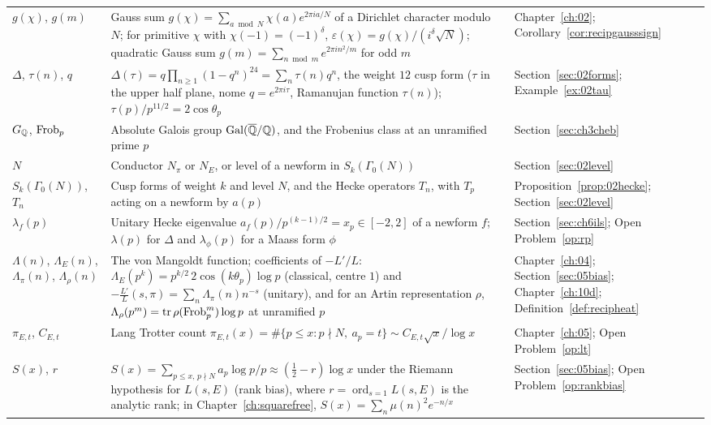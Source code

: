 {\begin{longtable}{p{0.8in}p{2.65in}p{0.95in}}
\raggedright $g(\chi)$, $g(m)$ & \raggedright Gauss sum $g(\chi)=\sum_{a\bmod N}\chi(a)e^{2\pi ia/N}$ of a Dirichlet character modulo $N$; for primitive $\chi$ with $\chi(-1)=(-1)^\delta$, $\varepsilon(\chi)=g(\chi)/(i^\delta\sqrt N)$; quadratic Gauss sum $g(m)=\sum_{n\bmod m}e^{2\pi in^2/m}$ for odd $m$ & \raggedright Chapter~\ref{ch:02}; Corollary~\ref{cor:recipgausssign}\tabularnewline[1pt]
\raggedright $\Delta$, $\tau(n)$, $q$ & \raggedright $\Delta(\tau)=q\prod_{n\ge1}(1-q^n)^{24}=\sum_n\tau(n)q^n$, the weight $12$ cusp form ($\tau$ in the upper half plane, nome $q=e^{2\pi i\tau}$, Ramanujan function $\tau(n)$); $\tau(p)/p^{11/2}=2\cos\theta_p$ & \raggedright Section~\ref{sec:02forms}; Example~\ref{ex:02tau}\tabularnewline[1pt]
\raggedright $G_{\mathbb{Q}}$, $\operatorname{Frob}_p$ & \raggedright Absolute Galois group $\operatorname{Gal}(\overline{\mathbb{Q}}/\mathbb{Q})$, and the Frobenius class at an unramified prime $p$ & \raggedright Section~\ref{sec:ch3cheb}\tabularnewline[1pt]
\raggedright $N$ & \raggedright Conductor $N_\pi$ or $N_E$, or level of a newform in $S_k(\Gamma_0(N))$ & \raggedright Section~\ref{sec:02level}\tabularnewline[1pt]
\raggedright $S_k(\Gamma_0(N))$, $T_n$ & \raggedright Cusp forms of weight $k$ and level $N$, and the Hecke operators $T_n$, with $T_p$ acting on a newform by $a(p)$ & \raggedright Proposition~\ref{prop:02hecke}; Section~\ref{sec:02level}\tabularnewline[1pt]
\raggedright $\lambda_f(p)$ & \raggedright Unitary Hecke eigenvalue $a_f(p)/p^{(k-1)/2}=x_p\in[-2,2]$ of a newform $f$; $\lambda(p)$ for $\Delta$ and $\lambda_\phi(p)$ for a Maass form $\phi$ & \raggedright Section~\ref{sec:ch6ils}; Open Problem~\ref{op:rp}\tabularnewline[1pt]
\raggedright $\Lambda(n)$, $\Lambda_E(n)$, $\Lambda_\pi(n)$, $\Lambda_\rho(n)$ & \raggedright The von Mangoldt function; coefficients of $-L'/L$: $\Lambda_E(p^k)=p^{k/2}\,2\cos(k\theta_p)\log p$ (classical, centre $1$) and $-\frac{L'}L(s,\pi)=\sum_n\Lambda_\pi(n)n^{-s}$ (unitary), and for an Artin representation $\rho$, $\Lambda_\rho(p^m)=\operatorname{tr}\rho(\operatorname{Frob}_p^m)\log p$ at unramified $p$ & \raggedright Chapter~\ref{ch:04}; Section~\ref{sec:05bias}; Chapter~\ref{ch:10d}; Definition~\ref{def:recipheat}\tabularnewline[1pt]
\raggedright $\pi_{E,t}$, $C_{E,t}$ & \raggedright Lang Trotter count $\pi_{E,t}(x)={\#\{p\le x:p\nmid N,\ a_p=t\}}\sim C_{E,t}\sqrt x/\log x$ & \raggedright Chapter~\ref{ch:05}; Open Problem~\ref{op:lt}\tabularnewline[1pt]
\raggedright $S(x)$, $r$ & \raggedright $S(x)=\sum_{p\le x,\,p\nmid N}a_p\log p/p\approx(\frac12-r)\log x$ under the Riemann hypothesis for $L(s,E)$ (rank bias), where $r=\operatorname{ord}_{s=1}L(s,E)$ is the analytic rank; in Chapter~\ref{ch:squarefree}, $S(x)=\sum_n\mu(n)^2e^{-n/x}$ & \raggedright Section~\ref{sec:05bias}; Open Problem~\ref{op:rankbias}\tabularnewline[1pt]

\end{longtable}}
